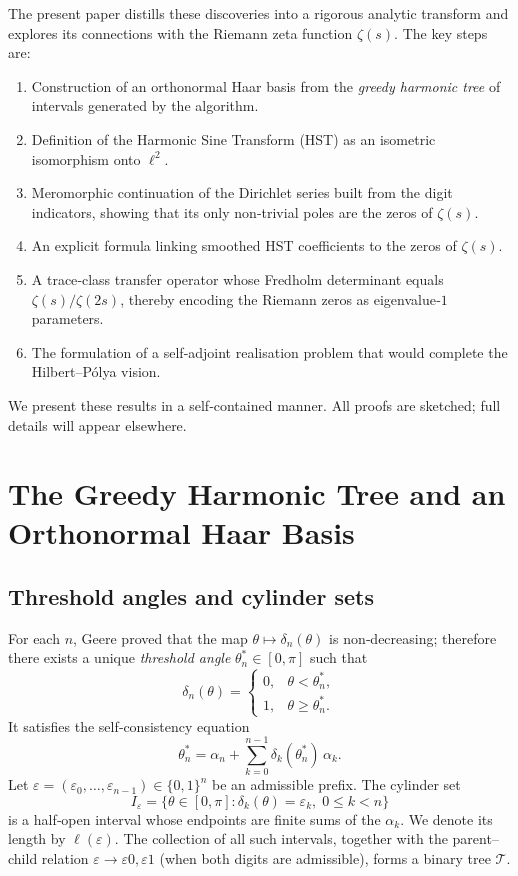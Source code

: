 \documentclass[11pt,a4paper]{article}
\theoremstyle{remark}
\begin{document}
The present paper distills these discoveries into a rigorous analytic transform and explores its connections with the Riemann zeta function \(\zeta(s)\). The key steps are:
\begin{enumerate}[label=(\arabic*)]
    \item Construction of an orthonormal Haar basis from the \emph{greedy harmonic tree} of intervals generated by the algorithm.
    \item Definition of the Harmonic Sine Transform (HST) as an isometric isomorphism onto \(\ell^2\).
    \item Meromorphic continuation of the Dirichlet series built from the digit indicators, showing that its only non‑trivial poles are the zeros of \(\zeta(s)\).
    \item An explicit formula linking smoothed HST coefficients to the zeros of \(\zeta(s)\).
    \item A trace‑class transfer operator whose Fredholm determinant equals \(\zeta(s)/\zeta(2s)\), thereby encoding the Riemann zeros as eigenvalue‑\(1\) parameters.
    \item The formulation of a self‑adjoint realisation problem that would complete the Hilbert–Pólya vision.
\end{enumerate}
We present these results in a self‑contained manner. All proofs are sketched; full details will appear elsewhere.

\section{The Greedy Harmonic Tree and an Orthonormal Haar Basis}

\subsection{Threshold angles and cylinder sets}
For each \(n\), Geere proved that the map \(\theta\mapsto\delta_n(\theta)\) is non‑decreasing; therefore there exists a unique \emph{threshold angle} \(\theta_n^*\in[0,\pi]\) such that
\begin{equation}\label{eq:threshold}
\delta_n(\theta)=
\begin{cases}
0,&\theta<\theta_n^*,\\[2pt]
1,&\theta\ge\theta_n^*.
\end{cases}
\end{equation}
It satisfies the self‑consistency equation
\[
\theta_n^*=\alpha_n+\sum_{k=0}^{n-1}\delta_k(\theta_n^*)\,\alpha_k .
\]
Let \(\varepsilon=(\varepsilon_0,\dots,\varepsilon_{n-1})\in\{0,1\}^n\) be an admissible prefix. The cylinder set
\[
I_\varepsilon=\{\theta\in[0,\pi]:\delta_k(\theta)=\varepsilon_k,\; 0\le k<n\}
\]
is a half‑open interval whose endpoints are finite sums of the \(\alpha_k\). We denote its length by \(\ell(\varepsilon)\). The collection of all such intervals, together with the parent–child relation \(\varepsilon\to\varepsilon0,\varepsilon1\) (when both digits are admissible), forms a binary tree \(\mathcal{T}\).
\end{document}

